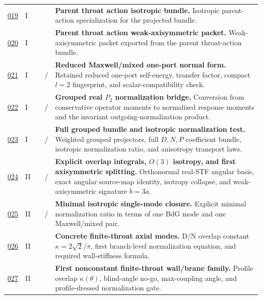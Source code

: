 {\begin{longtable}{@{}L{0.055\textwidth}L{0.075\textwidth}L{0.145\textwidth}L{0.235\textwidth}L{0.43\textwidth}@{}}
\addlinespace
\hyperref[stage:019]{019} & I &  & \StatusExactClosure{} & \textbf{Parent throat action isotropic bundle.} Isotropic parent-action specialization for the projected bundle. \\
\addlinespace
\hyperref[stage:020]{020} & I &  & \StatusExactClosure{} & \textbf{Parent throat action weak-axisymmetric packet.} Weak-axisymmetric packet exported from the parent throat-action bundle. \\
\addlinespace
\hyperref[stage:021]{021} & I &  & \StatusReduced{} / \StatusExactClosure{} & \textbf{Reduced Maxwell/mixed one-port normal form.} Retained reduced one-port self-energy, transfer factor, compact \(l=2\) fingerprint, and scalar-compatibility check. \\
\addlinespace
\hyperref[stage:022]{022} & I &  & \StatusExactClosure{} / \StatusOpen{} & \textbf{Grouped real \(P_2\) normalization bridge.} Conversion from conservative operator moments to normalized response moments and the invariant outgoing-normalization product. \\
\addlinespace
\hyperref[stage:023]{023} & I &  & \StatusExactClosure{} / \StatusOpen{} & \textbf{Full grouped bundle and isotropic normalization test.} Weighted grouped projectors, full \(D,N,P\) coefficient bundle, isotropic normalization ratio, and anisotropy transport laws. \\
\addlinespace
\hyperref[stage:024]{024} & II &  & \StatusExactClosure{} / \StatusReduced{} & \textbf{Explicit overlap integrals, \(O(3)\) isotropy, and first axisymmetric splitting.} Orthonormal real-STF angular basis, exact angular source-map identity, isotropy collapse, and weak-axisymmetric signature \(b=3a\). \\
\addlinespace
\hyperref[stage:025]{025} & II &  & \StatusExactClosure{} / \StatusOpen{} & \textbf{Minimal isotropic single-mode closure.} Explicit minimal normalization ratio in terms of one BdG mode and one Maxwell/mixed pair. \\
\addlinespace
\hyperref[stage:026]{026} & II &  & \StatusExactClosure{} & \textbf{Concrete finite-throat axial modes.} D/N overlap constant \(\kappa=2\sqrt2/\pi\), first branch-level normalization equation, and required wall-stiffness formula. \\
\addlinespace
\hyperref[stage:027]{027} & II &  & \StatusExactClosure{} & \textbf{First nonconstant finite-throat wall/brane family.} Profile overlap \(\kappa(\theta)\), blind-angle no-go, max-coupling angle, and profile-dressed normalization gate. \\

\end{longtable}}
